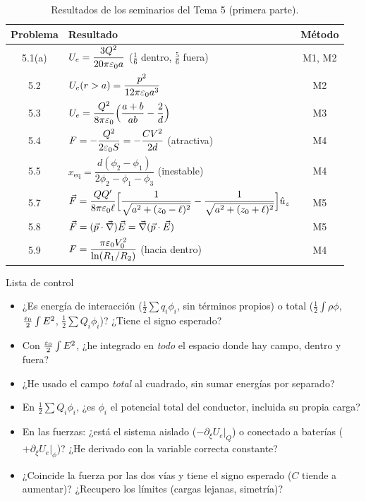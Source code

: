 \begin{table}[H]
\centering
\caption{Resultados de los seminarios del Tema 5 (primera parte).}\label{tab:resultados}
\small
\renewcommand{\arraystretch}{1.95}
\begin{tabularx}{\textwidth}{@{}c>{\raggedright\arraybackslash}Xc@{}}
\toprule
Problema & Resultado & Método\\
\midrule
5.1(a) & $U_e=\dfrac{3Q^2}{20\pi\varepsilon_0 a}$ \quad ($\tfrac16$ dentro, $\tfrac56$ fuera) & M1, M2\\
5.2 & $U_e(r>a)=\dfrac{p^2}{12\pi\varepsilon_0 a^3}$ & M2\\
5.3 & $U_e=\dfrac{Q^2}{8\pi\varepsilon_0}\Big(\dfrac{a+b}{ab}-\dfrac2d\Big)$ & M3\\
5.4 & $F=-\dfrac{Q^2}{2\varepsilon_0 S}=-\dfrac{CV^2}{2d}$ (atractiva) & M4\\
5.5 & $x_{\mathrm{eq}}=\dfrac{d(\phi_2-\phi_1)}{2\phi_2-\phi_1-\phi_3}$ (inestable) & M4\\
5.7 & $\vec F=\dfrac{QQ'}{8\pi\varepsilon_0\ell}\Big[\dfrac{1}{\sqrt{a^2+(z_0-\ell)^2}}-\dfrac{1}{\sqrt{a^2+(z_0+\ell)^2}}\Big]\hat u_{z}$ & M5\\
5.8 & $\vec F=(\vec p\cdot\vec\nabla)\vec E=\vec\nabla(\vec p\cdot\vec E)$ & M5\\
5.9 & $F=\dfrac{\pi\varepsilon_0 V_0^2}{\ln(R_1/R_2)}$ (hacia dentro) & M4\\
\bottomrule
\end{tabularx}
\end{table}

\begin{metodo}{Lista de control}
\begin{itemize}
  \item ¿Es energía de interacción ($\frac12\sum q_i\phi_i$, sin términos propios) o total ($\frac12\int\rho\phi$, $\frac{\varepsilon_0}{2}\int E^2$, $\frac12\sum Q_i\phi_i$)? ¿Tiene el signo esperado?
  \item Con $\frac{\varepsilon_0}{2}\int E^2$, ¿he integrado en \emph{todo} el espacio donde hay campo, dentro y fuera?
  \item ¿He usado el campo \emph{total} al cuadrado, sin sumar energías por separado?
  \item En $\frac12\sum Q_i\phi_i$, ¿es $\phi_i$ el potencial total del conductor, incluida su propia carga?
  \item En las fuerzas: ¿está el sistema aislado ($-\partial_\xi U_e|_Q$) o conectado a baterías ($+\partial_\xi U_e|_\phi$)? ¿He derivado con la variable correcta constante?
  \item ¿Coincide la fuerza por las dos vías y tiene el signo esperado ($C$ tiende a aumentar)? ¿Recupero los límites (cargas lejanas, simetría)?
\end{itemize}
\end{metodo}
